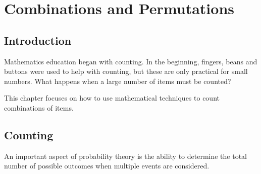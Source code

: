 \chapter{Combinations and Permutations}
\label{m:p12}



\section{Introduction}
Mathematics education began with counting. In the beginning, fingers, beans and buttons were used to help with counting, but these are only practical for small numbers. What happens when a large number of items must be counted?

This chapter focuses on how to use mathematical techniques to count combinations of items.

\section{Counting}
An important aspect of probability theory is the ability to determine the total number of possible outcomes when multiple events are considered.

